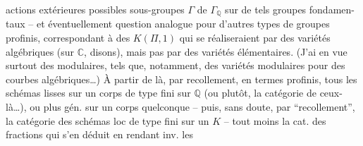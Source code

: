 actions extérieures possibles  sous-groupes $\Gamma$ de $\Gamma_{\mathbb{Q}}$ sur de tels groupes fondamen-taux -- et éventuellement question analogue pour d'autres types de groupes profinis, correspondant à des $K(\Pi,1)$ qui se réaliseraient par des variétés algébriques (sur $\mathbb{C}$, disons), mais pas par des variétés élémentaires. (J'ai en vue surtout des   modulaires, tels que, notamment, des variétés modulaires pour des courbes algébriques\ldots) À partir de là,   par recollement, en termes profinis, tous les schémas lisses sur un corps de type fini sur $\mathbb{Q}$ (ou plutôt, la catégorie de ceux-là\ldots), ou plus gén. sur un corps quelconque -- puis, sans doute, par ``recollement'', la catégorie des schémas loc de type fini sur  un $K$ -- tout  moins la cat. des fractions qui s'en déduit en  rendant inv. les
